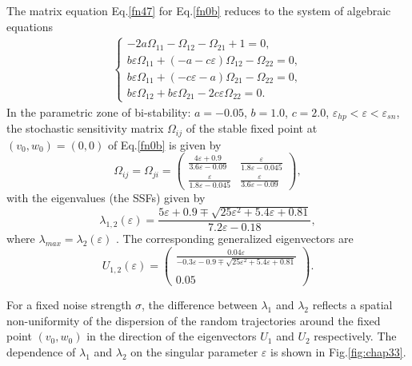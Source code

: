 The matrix equation Eq.\eqref{fn47} for Eq.\eqref{fn0b} reduces to
the system of algebraic equations \begin{equation}\label{fn48}
\begin{split}
\left\{\begin{array}{lcl}
-2a\Omega_{11}-\Omega_{12}-\Omega_{21}+1=0,\\
b\varepsilon\Omega_{11}+(-a-c\varepsilon)\Omega_{12}-\Omega_{22}=0,\\
b\varepsilon\Omega_{11}+(-c\varepsilon-a)\Omega_{21}-\Omega_{22}=0,\\
b\varepsilon\Omega_{12}+b\varepsilon\Omega_{21}-2c\varepsilon\Omega_{22}=0.
\end{array}\right.
\end{split}
\end{equation}
In the parametric zone of bi-stability: $a=-0.05$, $b=1.0$,
$c=2.0$, $\varepsilon_{hp}<\varepsilon<\varepsilon_{sn}$, the
stochastic sensitivity matrix $\Omega_{ij}$ of the stable fixed
point at $(v_0,w_0)=(0,0)$ of Eq.\eqref{fn0b} is given by
\begin{equation}\label{fn49}
\Omega_{ij}=\Omega_{ji}=\left( \begin{array}{cc} \frac{4\varepsilon
+0.9}{3.6\varepsilon-0.09} & \frac{\varepsilon}{1.8\varepsilon-0.045}\\
\frac{\varepsilon}{1.8\varepsilon-0.045} & 
\frac{\varepsilon}{3.6\varepsilon-0.09} \end{array} \right),
\end{equation}
with the eigenvalues (the SSFs) given by
\begin{equation}\label{fn50a}
\lambda_{1,2}(\varepsilon)=\frac{5\varepsilon+
0.9\mp\sqrt{25\varepsilon^2+5.4\varepsilon +0.81}}{7.2\varepsilon-0.18},
\end{equation}
where $\lambda_{max}=\lambda_2(\varepsilon)$ .
The corresponding generalized eigenvectors are 
\begin{equation}\label{fn50b}
U_{1,2}(\varepsilon)=\left( \begin{array}{c} \frac{0.04\varepsilon}
{-0.3\varepsilon-0.9\mp\sqrt{25\varepsilon^2+5.4\varepsilon+0.81}} \\\\
0.05 \end{array} \right).
\end{equation}

For a fixed noise strength $\sigma$, the difference between
$\lambda_1$ and $\lambda_2$ reflects a spatial non-uniformity of
the dispersion of the random trajectories around the fixed point 
$(v_0,w_0)$ in the direction of the
eigenvectors $U_1$ and $U_2$ respectively. The dependence of
$\lambda_1$ and $\lambda_2$ on the singular parameter
$\varepsilon$ is shown in Fig.\ref{fig:chap33}.


